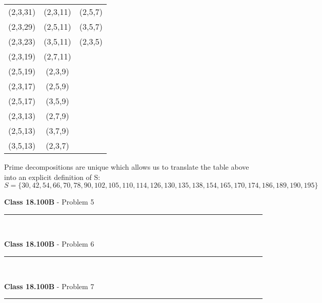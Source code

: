 \documentclass[11pt,reqno]{article}
\begin{document}
\begin{tabular}{c c c}
(2,3,31) & (2,3,11) & (2,5,7)\\
(2,3,29) & (2,5,11) & (3,5,7)\\
(2,3,23) & (3,5,11)& (2,3,5)\\
(2,3,19) & (2,7,11) & \\
(2,5,19) & (2,3,9) & \\
(2,3,17) & (2,5,9) & \\
(2,5,17) & (3,5,9) & \\
(2,3,13) & (2,7,9) & \\
(2,5,13) & (3,7,9) & \\
(3,5,13) & (2,3,7) & \\
\end{tabular}

\vspace{10pt}
Prime decompositions are unique which allows us to translate the table above into an explicit definition of S:
\[
S = \{ 30,42,54,66, 70,78,90,102,105,110,114,126,130,135,138,154,165,170,174,186,189,190,195 \}
\]

\vspace{15pt}
\begin{flushleft} 
\textbf{Class 18.100B} - Problem 5\\
\rule{500pt}{1pt}\\
\end{flushleft} 

\vspace{15pt}
\begin{flushleft} 
\textbf{Class 18.100B} - Problem 6\\
\rule{500pt}{1pt}\\
\end{flushleft} 


\vspace{15pt}
\begin{flushleft} 
\textbf{Class 18.100B} - Problem 7\\
\rule{500pt}{1pt}\\
\end{flushleft} 
\end{document}
